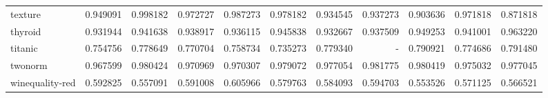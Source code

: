 \begin{tabular}{lrrrrrrrrrr}
texture         &   0.949091 &  0.998182 &  0.972727 &  0.987273 &  0.978182 &  0.934545 &  0.937273 &  0.903636 &  0.971818 &  0.871818 \\
thyroid         &   0.931944 &  0.941638 &  0.938917 &  0.936115 &  0.945838 &  0.932667 &  0.937509 &  0.949253 &  0.941001 &  0.963220 \\
titanic         &   0.754756 &  0.778649 &  0.770704 &  0.758734 &  0.735273 &  0.779340 &       - &  0.790921 &  0.774686 &  0.791480 \\
twonorm         &   0.967599 &  0.980424 &  0.970969 &  0.970307 &  0.979072 &  0.977054 &  0.981775 &  0.980419 &  0.975032 &  0.977045 \\
winequality-red &   0.592825 &  0.557091 &  0.591008 &  0.605966 &  0.579763 &  0.584093 &  0.594703 &  0.553526 &  0.571125 &  0.566521 \\
\bottomrule
\end{tabular}
